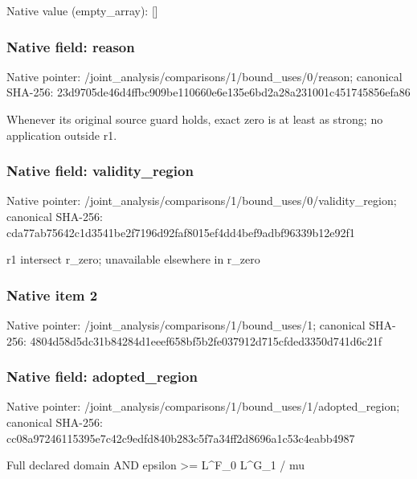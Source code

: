 \documentclass[10pt,a4paper]{article}
\begin{document}
Native value (empty\_\allowbreak{}array): []

\subsubsection{Native field: reason}
Native pointer: /joint\_\allowbreak{}analysis/comparisons/1/bound\_\allowbreak{}uses/0/reason; canonical SHA-256: 23d9705de46d4ffbc909be110660e6e135e6bd2a28a231001c451745856efa86

\begingroup\raggedright\sloppy Whenever its original source guard holds,\allowbreak{} exact zero is at least as strong;\allowbreak{} no application outside r1.\par\endgroup

\subsubsection{Native field: validity\_\allowbreak{}region}
Native pointer: /joint\_\allowbreak{}analysis/comparisons/1/bound\_\allowbreak{}uses/0/validity\_\allowbreak{}region; canonical SHA-256: cda77ab75642c1d3541be2f7196d92faf8015ef4dd4bef9adbf96339b12e92f1

\begingroup\raggedright\sloppy r1 intersect r\_\allowbreak{}zero;\allowbreak{} unavailable elsewhere in r\_\allowbreak{}zero\par\endgroup

\subsubsection{Native item 2}
Native pointer: /joint\_\allowbreak{}analysis/comparisons/1/bound\_\allowbreak{}uses/1; canonical SHA-256: 4804d58d5dc31b84284d1eeef658bf5b2fe037912d715cfded3350d741d6c21f

\subsubsection{Native field: adopted\_\allowbreak{}region}
Native pointer: /joint\_\allowbreak{}analysis/comparisons/1/bound\_\allowbreak{}uses/1/adopted\_\allowbreak{}region; canonical SHA-256: cc08a97246115395e7c42c9edfd840b283c5f7a34ff2d8696a1c53c4eabb4987

\begingroup\raggedright\sloppy Full declared domain AND epsilon >=\allowbreak{} L\textasciicircum{}F\_\allowbreak{}0 L\textasciicircum{}G\_\allowbreak{}1 /\allowbreak{} mu\par\endgroup
\end{document}
